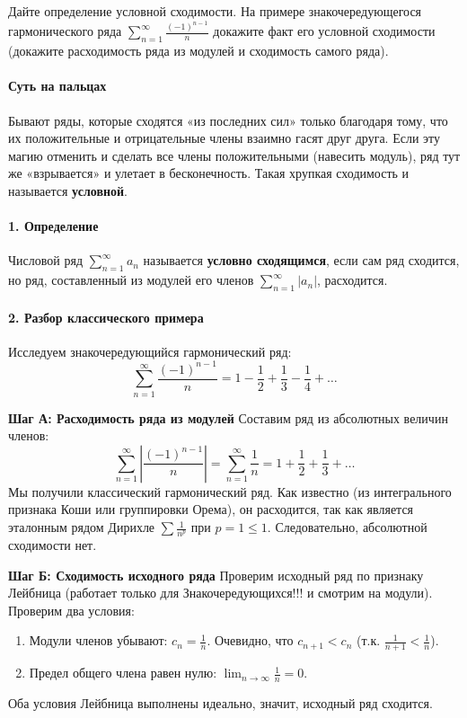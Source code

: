 
{Дайте определение условной сходимости. На примере знакочередующегося гармонического ряда $\sum_{n=1}^{\infty}\frac{(-1)^{n-1}}{n}$ докажите факт его условной сходимости (докажите расходимость ряда из модулей и сходимость самого ряда).}

\paragraph{Суть на пальцах}
Бывают ряды, которые сходятся «из последних сил» только благодаря тому, что их положительные и отрицательные члены взаимно гасят друг друга. Если эту магию отменить и сделать все члены положительными (навесить модуль), ряд тут же «взрывается» и улетает в бесконечность. Такая хрупкая сходимость и называется \textbf{условной}.

\paragraph{1. Определение}
Числовой ряд $\sum_{n=1}^{\infty} a_n$ называется \textbf{условно сходящимся}, если сам ряд сходится, но ряд, составленный из модулей его членов $\sum_{n=1}^{\infty} |a_n|$, расходится.

\paragraph{2. Разбор классического примера}
Исследуем знакочередующийся гармонический ряд:
$$ \sum_{n=1}^{\infty} \frac{(-1)^{n-1}}{n} = 1 - \frac{1}{2} + \frac{1}{3} - \frac{1}{4} + \dots $$

\textbf{Шаг А: Расходимость ряда из модулей}
Составим ряд из абсолютных величин членов:
$$ \sum_{n=1}^{\infty} \left| \frac{(-1)^{n-1}}{n} \right| = \sum_{n=1}^{\infty} \frac{1}{n} = 1 + \frac{1}{2} + \frac{1}{3} + \dots $$
Мы получили классический гармонический ряд. Как известно (из интегрального признака Коши или группировки Орема), он расходится, так как является эталонным рядом Дирихле $\sum \frac{1}{n^p}$ при $p=1 \le 1$. Следовательно, абсолютной сходимости нет.

\textbf{Шаг Б: Сходимость исходного ряда}
Проверим исходный ряд по признаку Лейбница (работает только для Знакочередующихся!!! и смотрим на модули). Проверим два условия:
\begin{enumerate}
    \item Модули членов убывают: $c_n = \frac{1}{n}$. Очевидно, что $c_{n+1} < c_n$ (т.к. $\frac{1}{n+1} < \frac{1}{n}$).
    \item Предел общего члена равен нулю: $\lim_{n \to \infty} \frac{1}{n} = 0$.
\end{enumerate}
Оба условия Лейбница выполнены идеально, значит, исходный ряд сходится.

